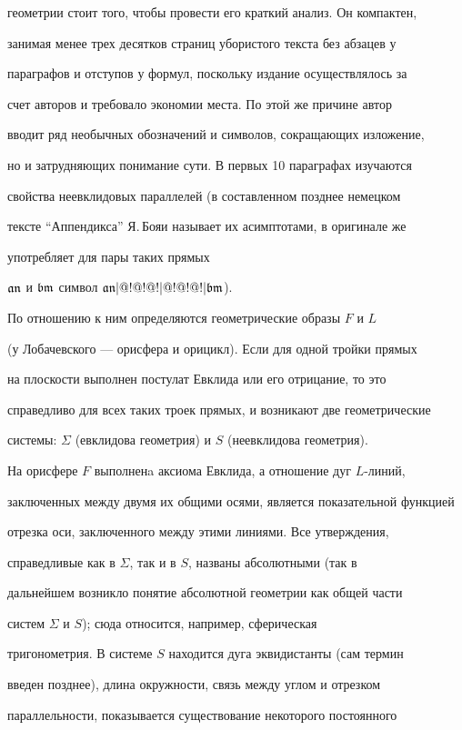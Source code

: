 геометрии стоит того, чтобы провести его краткий анализ. Он компактен, 


занимая менее трех десятков страниц убористого текста без абзацев у 


параграфов и отступов у формул, поскольку издание осуществлялось за 


счет авторов и требовало экономии места. По этой же причине автор 


вводит ряд необычных обозначений и символов, сокращающих изложение, 


но и затрудняющих понимание сути. В первых 10 параграфах изучаются 


свойства неевклидовых параллелей (в составленном позднее немецком 


тексте ``Аппендикса'' Я.\,Бояи называет их асимптотами, в оригинале же 


употребляет для пары таких прямых


$\frak{an}$ и $\frak{bm}$ символ $\frak{an}|@!@!@!|@!@!@!|\frak{bm}$).


По отношению к ним определяются геометрические образы $F$ и $L$


(у Лобачевского --- орисфера и орицикл). Если для одной тройки прямых 


на плоскости выполнен постулат Евклида или его отрицание, то это 


справедливо для всех таких троек прямых, и возникают две геометрические 


системы: $\Sigma$ (евклидова геометрия) и $S$ (неевклидова геометрия).


На орисфере $F$ выполненa аксиома Евклида, а отношение дуг $L$-линий, 


заключенных между двумя их общими осями, является показательной функцией 


отрезка оси, заключенного между этими линиями. Все утверждения, 


справедливые как в $\Sigma$, так и в $S$, названы абсолютными (так в 


дальнейшем возникло понятие абсолютной геометрии как общей части 


систем $\Sigma$ и $S$); сюда относится, например, сферическая 


тригонометрия. В системе $S$ находится дуга эквидистанты (сам термин 


введен позднее), длина окружности, связь между углом и отрезком 


параллельности, показывается существование некоторого постоянного 


